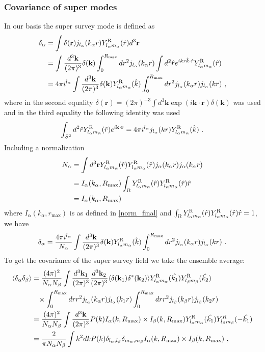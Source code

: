 \subsubsection{Covariance of super modes}
In our basis the super survey mode is defined as 
\begin{align} 
\begin{split} 
\delta_\alpha& = \int \delta(\mathbf{r}) j_{l_\alpha}(k_\alpha r) Y^\text{R}_{l_\alpha m_\alpha}(\hat{r}) d^3 \mathbf{r}  \\
& = \int \frac{ d^3 \mathbf{k}}{(2 \pi)^3} \delta(\mathbf{k}) \int_0^{R_\text{max}} dr^2 j_{l_\alpha}(k_\alpha r) \int d^2 \hat{r} e^{ikr \hat{k} \cdot \hat{r}} Y^\text{R}_{l_\alpha m_\alpha}(\hat{r}) \\
& =4 \pi i^{l_\alpha}\int  \frac{ d^3 \mathbf{k}}{(2 \pi)^3} \delta(\mathbf{k})  Y^\text{R}_{l_\alpha m_\alpha}(\hat{k})  \int_0^{R_\text{max}} dr^2 j_{l_\alpha}(k_\alpha r) j_{l_\alpha}(kr)  ~,
\end{split} 
\end{align} 
where in the second equality $\delta(\mathbf{r})=(2\pi)^{-3} \int d^3 \mathbf{k} \exp(i \mathbf{k} \cdot \mathbf{r}) \delta(\mathbf{k})$ was used and in the third equality the following identity was used 
\begin{align} \int_{S^2} d^2 \hat{r} Y^\text{R}_{l_\alpha m_\alpha}(\hat{r}) e^{i \mathbf{k} \cdot \mathbf{r}} = 4 \pi i^{l_\alpha} j_{l_\alpha}(k r)Y^\text{R}_{l_\alpha m_\alpha}(\hat{k})~.
\end{align}
Including a normalization
\begin{align}\label{normalization}
N_\alpha&=\int{d^3\mathbf{r}Y^\text{R}_{l_\alpha m_\alpha}(\hat{r}) Y^\text{R}_{l_\alpha m_\alpha}(\hat{r}) j_\alpha(k_\alpha r) j_\alpha(k_\alpha r)} \\
&=  I_\alpha(k_\alpha, R_\text{max})  \int_\Omega Y^\text{R}_{l_\alpha m_\alpha}(\hat{r}) Y^\text{R}_{l_\alpha m_\alpha}(\hat{r}) \hat{r}\\
& =I_\alpha(k_\alpha, R_{\text{max}})  
\end{align}
where $ I_\alpha(k_\alpha, r_{\text{max}}) $ is as defined in \eqref{norm_final} and $ \int_\Omega Y^\text{R}_{l_\alpha m_\alpha}(\hat{r}) Y^\text{R}_{l_\alpha m_\alpha}(\hat{r}) \hat{r}=1$, we have
\begin{align} 
\delta_\alpha= \frac{4 \pi i^{l_\alpha}}{N_\alpha} \int  \frac{ d^3 \mathbf{k}}{(2 \pi)^3} \delta(\mathbf{k})  Y^\text{R}_{l_\alpha m_\alpha}(\hat{k})  \int_0^{R_\text{max}} dr^2 j_{l_\alpha}(k_\alpha r) j_{l_\alpha}(kr)  ~.
\end{align} 
To get the covariance of the super survey field we take the ensemble average:
\begin{align} 
\begin{split} 
\langle \delta_\alpha \delta_\beta \rangle &= \frac{ (4 \pi)^2}{N_\alpha N_\beta} \int  \frac{ d^3 \mathbf{k}_{1}}{(2 \pi)^3} \frac{ d^3 \mathbf{k}_{2}}{(2 \pi)^3} \langle \delta(\mathbf{k}_1) \delta^*(\mathbf{k}_2) \rangle Y^\text{R}_{l_\alpha m_\alpha}(\hat{k_1}) Y^\text{R}_{l_\beta m_\beta}(\hat{k_2}) \\
& \;\;\; \times   \int_0^{R_\text{max}}  dr r^2 j_{l_\alpha}(k_\alpha r) j_{l_\alpha}( k_1 r) \int_0^{R_\text{max}}  dr r^2 j_{l_\beta}(k_\beta r) j_{l_\beta}( k_2 r)  \\
&= \frac{ (4 \pi)^2}{N_\alpha N_\beta} \int \frac{ d^3 \mathbf{k}}{(2 \pi)^3} P(k) I_\alpha(k, R_\text{max}) \times I_\beta(k, R_\text{max})Y^\text{R}_{l_\alpha m_\alpha}(\hat{k_1})Y^R_{l_\beta m_\beta}(-\hat{k_1})\\
&=\frac{2}{\pi N_\alpha N_\beta}\int{k^2 dk P(k) \delta_{l_\alpha,l_\beta}\delta_{m_\alpha,m_\beta} I_\alpha(k, R_\text{max}) \times I_\beta(k, R_\text{max})}~,
\end{split} 
\end{align} 
